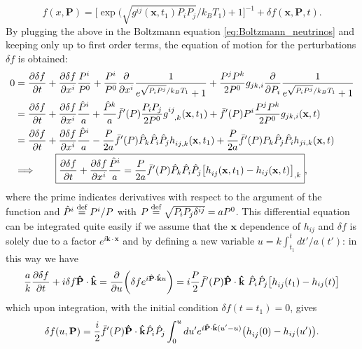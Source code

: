 $$f(x,\mathbf P)=\bigg[\exp\bigg(\sqrt{g^{ij}(\mathbf x,t_1)P_iP_j}/k_B T_1\bigg)+1\bigg]^{-1}+\delta f(\mathbf{x},\mathbf{P},t).$$
By plugging the above in the Boltzmann equation \eqref{eq:Boltzmann_neutrinos} and keeping only up to first order terms, the equation of motion for the perturbations $\delta f$ is obtained:
\begin{align*}
   0&=\frac{\partial \delta f}{\partial t}+\frac{\partial \delta f}{\partial x^i}\frac{P^i}{P^0}+\frac{P^i}{P^0}\frac{\partial }{\partial x^i}\frac{1}{e^{\sqrt{P_iP^j}/k_BT_1}+1}+\frac{P^jP^k}{2P^0}g_{jk,i}\frac{\partial }{\partial P_i}\frac{1}{e^{\sqrt{P_iP^j}/k_BT_1}+1}\\&= \frac{\partial \delta f}{\partial t}+\frac{\partial \delta f}{\partial x^i}\frac{\hat P^i}{a}+\frac{\hat P^k}{a}\bar f'(P)\frac{P_iP_j}{2P^0}\tensor{g}{^i^j_,_k}(\mathbf{x},t_1)+\bar f'(P)P^i\frac{P^jP^k}{2P^0}g_{jk,i}(\mathbf x, t) \\&= \frac{\partial \delta f}{\partial t}+\frac{\partial \delta f}{\partial x^i}\frac{\hat P^i}{a}-\frac{P}{2a}\bar f'(P)\hat P_k\hat P_i\hat P_j\tensor{h}{_i_j_,_k}(\mathbf{x},t_1)+\frac{P}{2a}\bar f'(P)P_k\hat P_j\hat P_ih_{ji,k}(\mathbf x, t)\\
   &\Longrightarrow\qquad \boxed{\frac{\partial \delta f}{\partial t}+\frac{\partial \delta f}{\partial x^i}\frac{\hat P^i}{a}=\frac{P}{2a}\bar f'(P)\hat P_k\hat P_i\hat P_j\big[\tensor{h}{_i_j}(\mathbf{x},t_1)-h_{ij}(\mathbf x, t)\big]_{,k}},
\end{align*}
where the prime indicates derivatives with respect to the argument of the function and $\hat P^i\stackrel{\text{def}}{=} P^i/P$ with $P\stackrel{\text{def}}{=}{\sqrt{P_iP_j\delta^{ij}}}=a P^0$. This differential equation can be integrated quite easily if we assume that the $\mathbf x$ dependence of $h_{ij}$ and $\delta f$ is solely due to a factor $e^{i\mathbf{k\cdot x}}$ and by defining a new variable $u= k\int_{t_1}^{t}dt'/a(t')$: in this way we have
$$\frac{a}{k}\frac{\partial \delta f}{\partial t}+i\delta f \mathbf{\hat P\cdot\hat k}=\frac{\partial}{\partial u}\bigg(\delta f e^{i\mathbf{\hat P\cdot\hat k}u}\bigg)=i\frac{P}{2}\bar f'(P)\mathbf{\hat P\cdot\hat k}\ \hat P_i\hat P_j\big[\tensor{h}{_i_j}(t_1)-h_{ij}( t)\big]$$
which upon integration, with the initial condition $\delta f(t=t_1)=0$, gives
\begin{equation}
    \delta f(u,\mathbf P) = \frac{i}{2}\bar f'(P)\mathbf{\hat P\cdot\hat k}\hat P_i\hat P_j\int_{0}^{u}du'e^{i\mathbf{\hat P\cdot\hat k}(u'-u)}\big(\tensor{h}{_i_j}(0)-h_{ij}(u')\big).
\end{equation}
